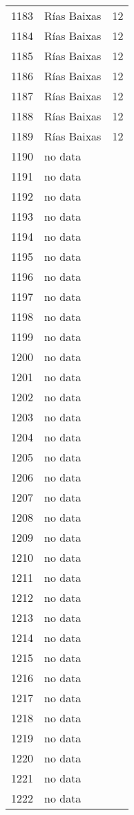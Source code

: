 \begin{table}[p]
\begin{tabular}{rlr}
  1183 & Rías Baixas &  12 \\ 
  1184 & Rías Baixas &  12 \\ 
  1185 & Rías Baixas &  12 \\ 
  1186 & Rías Baixas &  12 \\ 
  1187 & Rías Baixas &  12 \\ 
  1188 & Rías Baixas &  12 \\ 
  1189 & Rías Baixas &  12 \\ 
  1190 & no data &  \\ 
  1191 & no data &  \\ 
  1192 & no data &  \\ 
  1193 & no data &  \\ 
  1194 & no data &  \\ 
  1195 & no data &  \\ 
  1196 & no data &  \\ 
  1197 & no data &  \\ 
  1198 & no data &  \\ 
  1199 & no data &  \\ 
  1200 & no data &  \\ 
  1201 & no data &  \\ 
  1202 & no data &  \\ 
  1203 & no data &  \\ 
  1204 & no data &  \\ 
  1205 & no data &  \\ 
  1206 & no data &  \\ 
  1207 & no data &  \\ 
  1208 & no data &  \\ 
  1209 & no data &  \\ 
  1210 & no data &  \\ 
  1211 & no data &  \\ 
  1212 & no data &  \\ 
  1213 & no data &  \\ 
  1214 & no data &  \\ 
  1215 & no data &  \\ 
  1216 & no data &  \\ 
  1217 & no data &  \\ 
  1218 & no data &  \\ 
  1219 & no data &  \\ 
  1220 & no data &  \\ 
  1221 & no data &  \\ 
  1222 & no data &  \\ 

\end{tabular}
\end{table}
